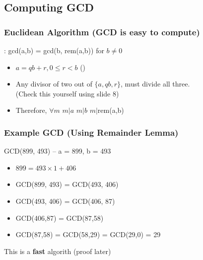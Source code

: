 \documentclass{beamer}
\begin{document}
\subsection{Computing GCD}
\begin{frame}
  \frametitle{Euclidean Algorithm (GCD is easy to compute)}

  {\larger

    : gcd(a,b) = gcd(b, rem(a,b))
    \hfill for $b \neq 0$

    \bigskip
    
    \begin{itemize}
    \item $a = qb + r, 0\leq r < b$  \hfill ()
    \item Any divisor of two out of $\{a,qb,r\}$, must divide all three.\\
      (\alert{Check this yourself using slide 8})
    \item Therefore, $\forall m$  $m|a$  $m|b$
       $m|$rem(a,b)
    \end{itemize}
  }  
\end{frame}

\begin{frame}
  \frametitle{Example GCD (Using Remainder Lemma)}

  {\larger
    \begin{center}
      GCD(899, 493) -- a = 899, b = 493
    \end{center}

    \vfill

    \begin{itemize}
    \item $899 = 493 \times 1 + 406$ \hfill {}
    \item GCD(899, 493) = GCD(493, 406) \hfill {}
    \item<2-> GCD(493, 406) = GCD(406, 87) \hfill {}
    \item<3-> GCD(406,87) = GCD(87,58) \hfill {}
    \item<4-> GCD(87,58) = GCD(58,29) = GCD(29,0) = \alert{29}
    \end{itemize}

    \bigskip

    This is a {\bf fast} algorith (proof later)
  }
\end{frame}
\end{document}
